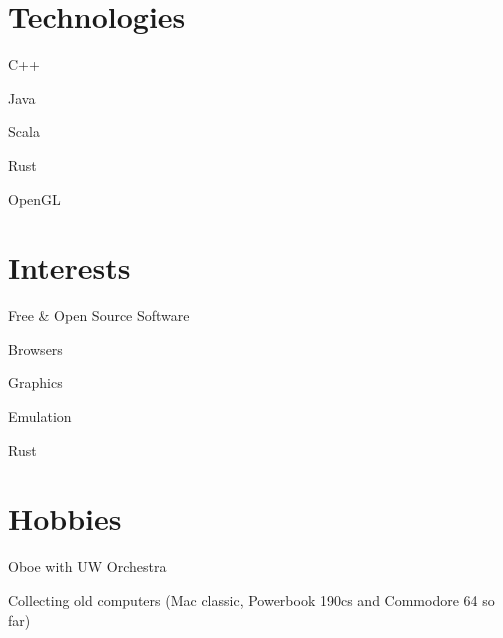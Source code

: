 \documentclass[12pt]{jmichaud-resume}
\begin{document}
	
\begin{minipage}[t]{0.29\textwidth}
\vspace{10pt}

\vspace{22pt}

\section{Technologies}
\vspace{7pt}
\begin{tightemize}
	\item C++
	\item Java
	\item Scala
	\item Rust
	\item OpenGL
\end{tightemize}

\vspace{15pt}

\section{Interests}
\vspace{7pt}
\begin{tightemize}
	\item Free \& Open Source Software
	\item Browsers
	\item Graphics
	\item Emulation
	\item Rust
\end{tightemize}

\vspace{20pt}

\section{Hobbies}
\vspace{7pt}
\begin{tightemize}
	\item Oboe with UW Orchestra
	\item Collecting old computers (Mac classic, Powerbook 190cs and Commodore 64 so far)
\end{tightemize}


\end{minipage}
\end{document}
